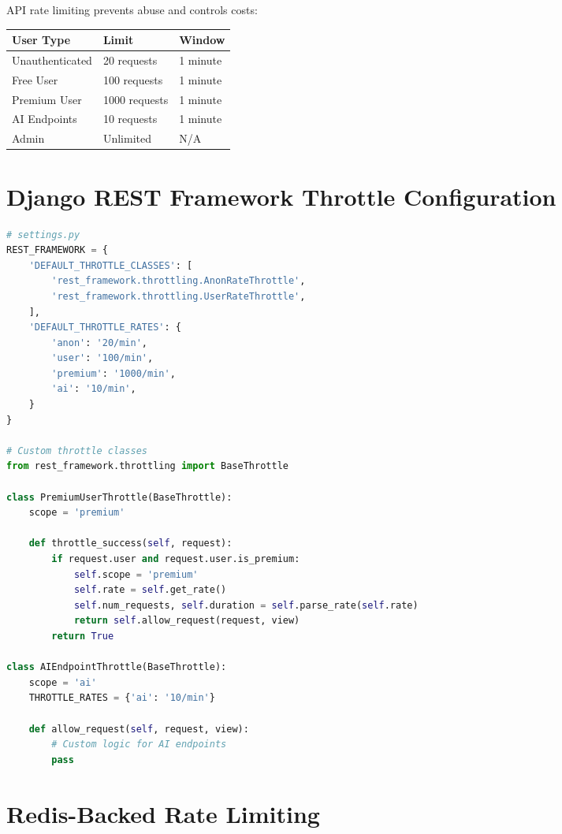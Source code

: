 \documentclass{report}
\begin{document}
API rate limiting prevents abuse and controls costs:

\begin{table}[h]
\centering
\small
\begin{tabular}{|l|l|p{2.5cm}|}
\hline
\textbf{User Type} & \textbf{Limit} & \textbf{Window} \\
\hline
Unauthenticated & 20 requests & 1 minute \\
\hline
Free User & 100 requests & 1 minute \\
\hline
Premium User & 1000 requests & 1 minute \\
\hline
AI Endpoints & 10 requests & 1 minute \\
\hline
Admin & Unlimited & N/A \\
\hline
\end{tabular}
\end{table}

\section{Django REST Framework Throttle Configuration}

\begin{lstlisting}[language=Python]
# settings.py
REST_FRAMEWORK = {
    'DEFAULT_THROTTLE_CLASSES': [
        'rest_framework.throttling.AnonRateThrottle',
        'rest_framework.throttling.UserRateThrottle',
    ],
    'DEFAULT_THROTTLE_RATES': {
        'anon': '20/min',
        'user': '100/min',
        'premium': '1000/min',
        'ai': '10/min',
    }
}

# Custom throttle classes
from rest_framework.throttling import BaseThrottle

class PremiumUserThrottle(BaseThrottle):
    scope = 'premium'
    
    def throttle_success(self, request):
        if request.user and request.user.is_premium:
            self.scope = 'premium'
            self.rate = self.get_rate()
            self.num_requests, self.duration = self.parse_rate(self.rate)
            return self.allow_request(request, view)
        return True

class AIEndpointThrottle(BaseThrottle):
    scope = 'ai'
    THROTTLE_RATES = {'ai': '10/min'}
    
    def allow_request(self, request, view):
        # Custom logic for AI endpoints
        pass
\end{lstlisting}

\section{Redis-Backed Rate Limiting}
\end{document}

